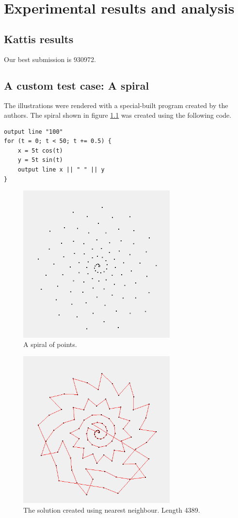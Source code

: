 \documentclass{report}
\begin{document}
\chapter{Experimental results and analysis}
\section{Kattis results}
Our best submission is 930972.

\section{A custom test case: A spiral}
The illustrations were rendered with a special-built program created by the authors. The spiral shown in figure \ref{fig:spiral} was created using the following code.
\begin{verbatim}
output line "100"
for (t = 0; t < 50; t += 0.5) {
    x = 5t cos(t)
    y = 5t sin(t)
    output line x || " " || y 
}
\end{verbatim}

\begin{figure}[h!]
\centering
\includegraphics[width=80mm]{spiral}
\caption{A spiral of points.}
\label{fig:spiral}
\end{figure}

\begin{figure}[h!]
\centering
\includegraphics[width=80mm]{nn_spiral}
\caption{The solution created using nearest neighbour. Length 4389.}
\end{figure}
\end{document}
